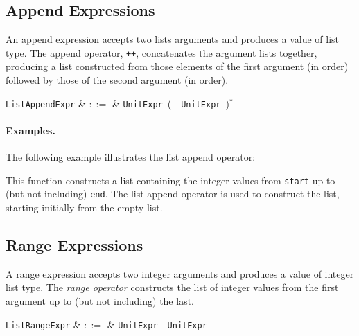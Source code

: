 
\subsection{Append Expressions}
\label{c_expr_append}

An append expression accepts two lists arguments and produces a value of list type.  The append operator, \lstinline{++}, concatenates the argument lists together, producing a list constructed from those elements of the first argument (in order) followed by those of the second argument (in order).

\begin{syntax}
  \verb+ListAppendExpr+ & $::=$ & \verb+UnitExpr+\ \big(\ \token{++}\
  \verb+UnitExpr+\ \big)$^*$\\
\end{syntax}

\paragraph{Examples.} The following example illustrates the list append operator:



This function constructs a list containing the integer values from \lstinline{start} up to (but not including) \lstinline{end}.  The list append operator is used to construct the list, starting initially from the empty list.


\subsection{Range Expressions}
\label{c_expr_range}

A range expression accepts two integer arguments and produces a value of integer list type.  The {\em range operator} constructs the list of integer values from the first argument up to (but not including) the last.

\begin{syntax}
  \verb+ListRangeExpr+ & $::=$ & \verb+UnitExpr+\ \ \verb+UnitExpr+\\
\end{syntax}

